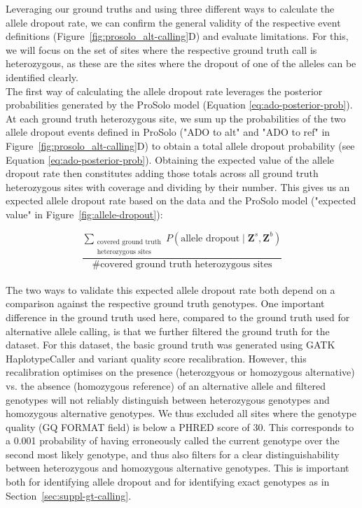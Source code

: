 \documentclass[authoryear,preprint,11pt]{scrartcl}
\newcommand{\Prob}{{P}}
\begin{document}
Leveraging our ground truths and using three different ways to calculate the allele dropout rate, we can confirm the general validity of the respective event definitions (Figure~\ref{fig:prosolo_alt-calling}D) and evaluate limitations.
For this, we will focus on the set of sites where the respective ground truth call is heterozygous, as these are the sites where the dropout of one of the alleles can be identified clearly.\\

The first way of calculating the allele dropout rate leverages the posterior probabilities generated by the ProSolo model (Equation \ref{eq:ado-posterior-prob}).
At each ground truth heterozygous site, we sum up the probabilities of the two allele dropout events defined in ProSolo ("ADO to alt" and "ADO to ref" in Figure~\ref{fig:prosolo_alt-calling}D) to obtain a total allele dropout probability (see Equation \ref{eq:ado-posterior-prob}).
Obtaining the expected value of the allele dropout rate then constitutes adding those totals across all ground truth heterozygous sites with coverage and dividing by their number.
This gives us an expected allele dropout rate based on the data and the ProSolo model ("expected value" in Figure~\ref{fig:allele-dropout}):

\begin{equation}
    \frac{\displaystyle\sum_{\substack{\text{covered ground truth}\\\text{heterozygous sites}}}  \Prob(\text{allele dropout} \mid \boldsymbol{Z}^s,\boldsymbol{Z}^b )}{\text{\# covered ground truth heterozygous sites}}
    \label{eq.expected-allele-dropout-rate}
\end{equation}\\

The two ways to validate this expected allele dropout rate both depend on a comparison against the respective ground truth genotypes.
One important difference in the ground truth used here, compared to the ground truth used for alternative allele calling, is that we further filtered the ground truth for the \cite{dong_accurate_2017} dataset.
For this dataset, the basic ground truth was generated using GATK HaplotypeCaller and variant quality score recalibration.
However, this recalibration optimises on the presence (heterozgyous or homozygous alternative) vs. the absence (homozygous reference) of an alternative allele and filtered genotypes will not reliably distinguish between heterozygous genotypes and homozygous alternative genotypes.
We thus excluded all sites where the genotype quality ({\ttfamily GQ} FORMAT field) is below a PHRED score of 30.
This corresponds to a 0.001 probability of having erroneously called the current genotype over the second most likely genotype, and thus also filters for a clear distinguishability between heterozygous and homozygous alternative genotypes.
This is important both for identifying allele dropout and for identifying exact genotypes as in Section~\ref{sec:suppl-gt-calling}.
\end{document}
